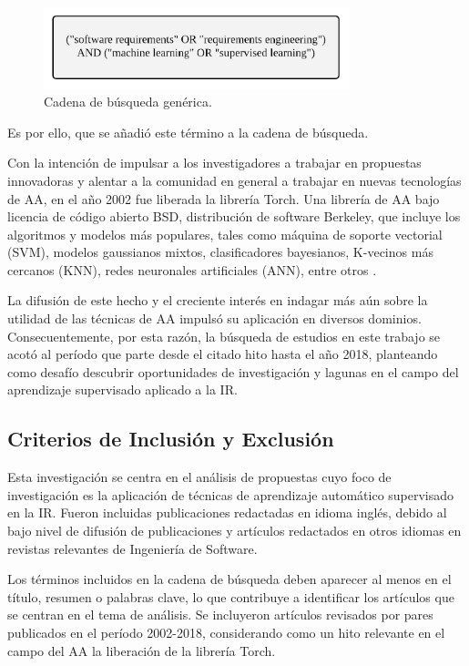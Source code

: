 \documentclass[journal]{IEEEtran}
\begin{document}
\begin{figure}[!t]
\centering
\includegraphics[width=3.5in]{figures/figure3_Guada.png}
\caption{Cadena de búsqueda genérica.}
\label{fig:3}
\end{figure}

Es por ello, que se añadió este término a la cadena de búsqueda.

Con la intención de impulsar a los investigadores a trabajar en propuestas innovadoras y alentar a la comunidad en general a trabajar en nuevas tecnologías de AA, en el año 2002 fue liberada la librería Torch. Una librería de AA bajo licencia de código abierto BSD, distribución de software Berkeley, que 
incluye los algoritmos y modelos más populares, tales como máquina de soporte vectorial (SVM), modelos gaussianos mixtos, clasificadores bayesianos, K-vecinos más cercanos (KNN), redes neuronales artificiales (ANN), entre otros \cite{collobert2002torch}.

La difusión de este hecho y el creciente interés en indagar más aún sobre la utilidad de las técnicas de AA impulsó su aplicación en diversos dominios. Consecuentemente, por esta razón, la búsqueda de estudios en este trabajo se acotó al período que parte desde el citado hito hasta el año 2018, planteando como desafío descubrir oportunidades de investigación y lagunas en el campo del aprendizaje supervisado aplicado a la IR.
\subsection{Criterios de Inclusión y Exclusión}

Esta investigación se centra en el análisis de propuestas cuyo foco de investigación es la aplicación de técnicas de aprendizaje automático supervisado en la IR. Fueron incluidas publicaciones redactadas en idioma inglés, debido al bajo nivel de difusión de publicaciones y artículos redactados en otros idiomas en revistas relevantes de Ingeniería de Software. 

Los términos incluidos en la cadena de búsqueda deben aparecer al menos en el título, resumen o palabras clave, lo que contribuye a identificar los artículos que se centran en el tema de análisis. Se incluyeron artículos revisados por pares publicados en el período 2002-2018, considerando como un hito relevante en el campo del AA la liberación de la librería Torch.
\end{document}

